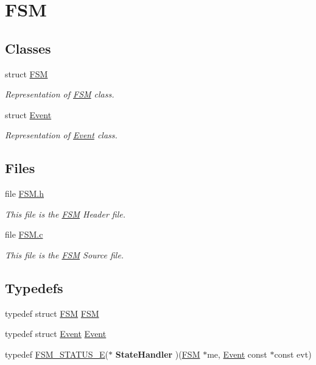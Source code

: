 \section{FSM}
\label{group___f_s_m}
\subsection*{Classes}
\begin{DoxyCompactItemize}
\item 
struct \hyperlink{struct_f_s_m}{FSM}
\begin{DoxyCompactList}\small\item\em Representation of \hyperlink{struct_f_s_m}{FSM} class. \end{DoxyCompactList}\item 
struct \hyperlink{struct_event}{Event}
\begin{DoxyCompactList}\small\item\em Representation of \hyperlink{struct_event}{Event} class. \end{DoxyCompactList}\end{DoxyCompactItemize}
\subsection*{Files}
\begin{DoxyCompactItemize}
\item 
file \hyperlink{_f_s_m_8h}{FSM.h}


\begin{DoxyCompactList}\small\item\em This file is the \hyperlink{struct_f_s_m}{FSM} Header file. \end{DoxyCompactList}

\item 
file \hyperlink{_f_s_m_8c}{FSM.c}


\begin{DoxyCompactList}\small\item\em This file is the \hyperlink{struct_f_s_m}{FSM} Source file. \end{DoxyCompactList}

\end{DoxyCompactItemize}
\subsection*{Typedefs}
\begin{DoxyCompactItemize}
\item 
typedef struct \hyperlink{struct_f_s_m}{FSM} \hyperlink{group___f_s_m_ga04808fa7704cea8244305a3ddc4ee907}{FSM}
\item 
typedef struct \hyperlink{struct_event}{Event} \hyperlink{group___f_s_m_ga607b119a19e65e2c1c7a606f21ab7a46}{Event}
\item 
typedef \hyperlink{group___f_s_m_ga64d3de8a4121adac058d8a5e116d9b7d}{FSM\_\-STATUS\_\-E}($\ast$ {\bfseries StateHandler} )(\hyperlink{struct_f_s_m}{FSM} $\ast$me, \hyperlink{struct_event}{Event} const $\ast$const evt)\label{group___f_s_m_ga1be99a3de151db40e2cd62ead060424c}

\end{DoxyCompactItemize}
